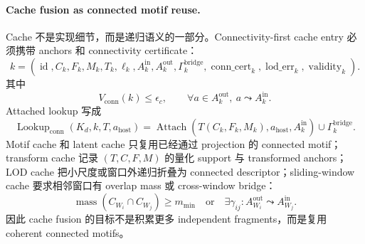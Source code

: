 \paragraph{Cache fusion as connected motif reuse.}
Cache 不是实现细节，而是递归语义的一部分。Connectivity-first cache entry 必须携带 anchors 和 connectivity certificate：
\begin{equation}
k=(\operatorname{id},C_k,F_k,M_k,T_k,\ell_k,
A_k^{\mathrm{in}},A_k^{\mathrm{out}},
\Gamma_k^{\mathrm{bridge}},
\operatorname{conn\_cert}_k,
\operatorname{lod\_err}_k,
\operatorname{validity}_k).
\end{equation}
其中
\begin{equation}
V_{\mathrm{conn}}(k)\le \epsilon_c,\qquad
\forall a\in A_k^{\mathrm{out}},\ a\leadsto A_k^{\mathrm{in}}.
\end{equation}
Attached lookup 写成
\begin{equation}
\operatorname{Lookup}_{\mathrm{conn}}(K_d,k,T,a_{\mathrm{host}})
=
\operatorname{Attach}(T(C_k,F_k,M_k),a_{\mathrm{host}},A_k^{\mathrm{in}})
\cup \Gamma_k^{\mathrm{bridge}}.
\end{equation}
Motif cache 和 latent cache 只复用已经通过 projection 的 connected motif；transform cache 记录 \((T,C,F,M)\) 的量化 support 与 transformed anchors；LOD cache 把小尺度或窗口外递归折叠为 connected descriptor；sliding-window cache 要求相邻窗口有 overlap mass 或 cross-window bridge：
\begin{equation}
\operatorname{mass}(C_{W_i}\cap C_{W_j})\ge m_{\min}
\quad\mathrm{or}\quad
\exists\gamma_{ij}:A_{W_i}^{\mathrm{out}}\leadsto A_{W_j}^{\mathrm{in}}.
\end{equation}
因此 cache fusion 的目标不是积累更多 independent fragments，而是复用 coherent connected motifs。

